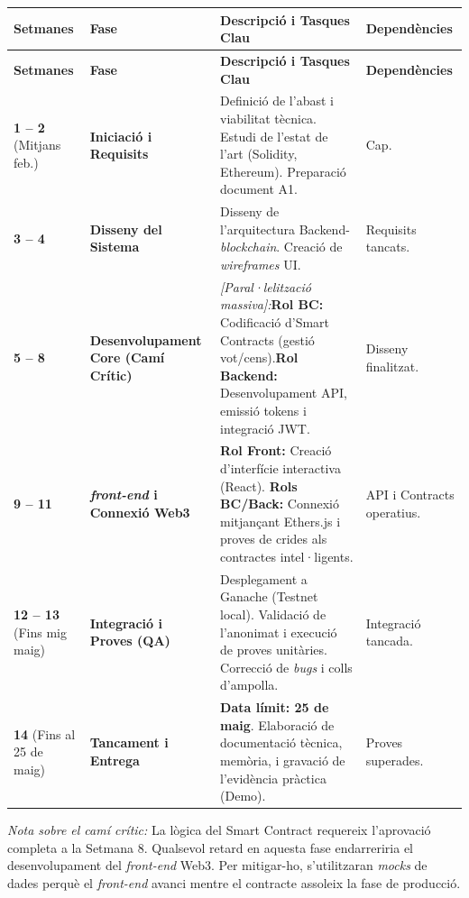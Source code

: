 \documentclass[12pt,a4paper]{article}
\begin{document}
\begin{longtable}{|p{2cm}|p{3.5cm}|p{7cm}|p{2.5cm}|}
\hline
\textbf{Setmanes} & \textbf{Fase} & \textbf{Descripció i Tasques Clau} & \textbf{Dependències} \\ \hline
\endfirsthead
\hline
\textbf{Setmanes} & \textbf{Fase} & \textbf{Descripció i Tasques Clau} & \textbf{Dependències} \\ \hline
\endhead
\hline
\endfoot
\hline
\endlastfoot

\textbf{1 -- 2} (Mitjans feb.) & \textbf{Iniciació i Requisits} & Definició de l'abast i viabilitat tècnica. Estudi de l'estat de l'art (Solidity, Ethereum). Preparació document A1. & Cap. \\ \hline

\textbf{3 -- 4} & \textbf{Disseny del Sistema} & Disseny de l'arquitectura Backend-\textit{blockchain}. Creació de \textit{wireframes} UI. & Requisits tancats. \\ \hline

\textbf{5 -- 8} & \textbf{Desenvolupament Core (Camí Crític)} & \textit{[Paral·lelització massiva]:}\newline \textbf{Rol BC:} Codificació d'Smart Contracts (gestió vot/cens).\newline \textbf{Rol Backend:} Desenvolupament API, emissió tokens i integració JWT. & Disseny finalitzat. \\ \hline

\textbf{9 -- 11} & \textbf{\textit{front-end} i Connexió Web3} & \textbf{Rol Front:} Creació d'interfície interactiva (React). \textbf{Rols BC/Back:} Connexió mitjançant Ethers.js i proves de crides als contractes intel·ligents. & API i Contracts operatius. \\ \hline

\textbf{12 -- 13} (Fins mig maig) & \textbf{Integració i Proves (QA)} & Desplegament a Ganache (Testnet local). Validació de l'anonimat i execució de proves unitàries. Correcció de \textit{bugs} i colls d'ampolla. & Integració tancada. \\ \hline

\textbf{14} (Fins al 25 de maig) & \textbf{Tancament i Entrega} & \textbf{Data límit: 25 de maig}. Elaboració de documentació tècnica, memòria, i gravació de l'evidència pràctica (Demo). & Proves superades. \\ \hline
\end{longtable}

\textit{Nota sobre el camí crític:} La lògica del Smart Contract requereix l'aprovació completa a la Setmana 8. Qualsevol retard en aquesta fase endarreriria el desenvolupament del \textit{front-end} Web3. Per mitigar-ho, s'utilitzaran \textit{mocks} de dades perquè el \textit{front-end} avanci mentre el contracte assoleix la fase de producció.
\end{document}
